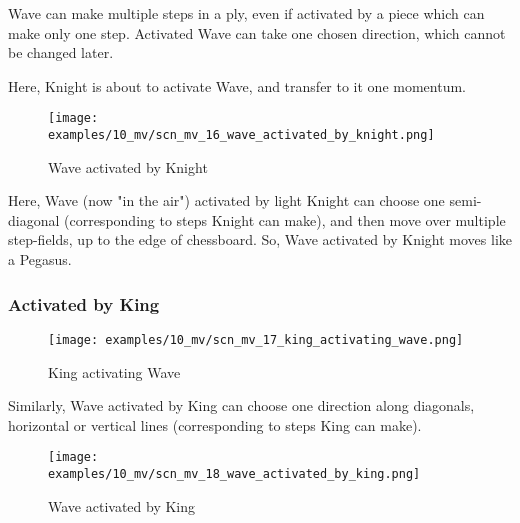 Wave can make multiple steps in a ply, even if activated by a piece which can make only
one step. Activated Wave can take one chosen direction, which cannot be changed later.

Here, Knight is about to activate Wave, and transfer to it one momentum.

\clearpage %

\vspace*{-2.1\baselineskip}
\noindent
\begin{figure}[!h]
\texttt{[image: examples/10\_mv/scn\_mv\_16\_wave\_activated\_by\_knight.png]}
\caption{Wave activated by Knight}
\label{fig:scn_mv_16_wave_activated_by_knight}
\end{figure}

Here, Wave (now "in the air") activated by light Knight can choose one semi-diagonal
(corresponding to steps Knight can make), and then move over multiple step-fields, up
to the edge of chessboard. So, Wave activated by Knight moves like a Pegasus.

\clearpage %

\subsubsection*{Activated by King}
\label{sec:Miranda's veil/Wave/Movement/Activated by King}

\vspace*{-1.4\baselineskip}
\noindent
\begin{figure}[h]
\texttt{[image: examples/10\_mv/scn\_mv\_17\_king\_activating\_wave.png]}
\caption{King activating Wave}
\label{fig:scn_mv_17_king_activating_wave}
\end{figure}

Similarly, Wave activated by King can choose one direction along diagonals, horizontal
or vertical lines (corresponding to steps King can make).

\clearpage %

\vspace*{-2.1\baselineskip}
\noindent
\begin{figure}[!h]
\texttt{[image: examples/10\_mv/scn\_mv\_18\_wave\_activated\_by\_king.png]}
\caption{Wave activated by King}
\label{fig:scn_mv_18_wave_activated_by_king}
\end{figure}

